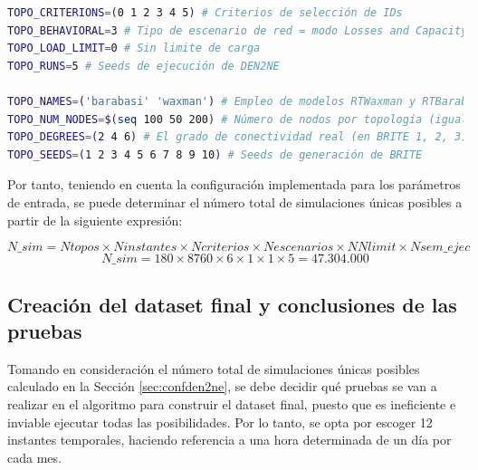\vspace{3mm}

\begin{lstlisting}[language=bash, style=Consola, caption={Configuración de los parámetros de entrada en el script de automatización de \acrshort{den2ne}}]
TOPO_CRITERIONS=(0 1 2 3 4 5) # Criterios de selección de IDs
TOPO_BEHAVIORAL=3 # Tipo de escenario de red = modo Losses and Capacity (3)         
TOPO_LOAD_LIMIT=0 # Sin limite de carga
TOPO_RUNS=5 # Seeds de ejecución de DEN2NE

TOPO_NAMES=('barabasi' 'waxman') # Empleo de modelos RTWaxman y RTBarabasi (igual que BRITE)
TOPO_NUM_NODES=$(seq 100 50 200) # Número de nodos por topología (igual que BRITE)
TOPO_DEGREES=(2 4 6) # El grado de conectividad real (en BRITE 1, 2, 3)
TOPO_SEEDS=(1 2 3 4 5 6 7 8 9 10) # Seeds de generación de BRITE
\end{lstlisting}

\vspace{3mm}

Por tanto, teniendo en cuenta la configuración implementada para los parámetros de entrada, se puede determinar el número total de simulaciones únicas posibles a partir de la siguiente expresión:

    \[\textit{N\_sim} = \textit{Ntopos} \times \textit{Ninstantes} \times \textit{Ncriterios} 
    \times \textit{Nescenarios} \times \textit{NNlimit} \times \textit{Nsem\_ejec}\]
    \[\textit{N\_sim} = 180 \times 8760 \times 6 \times 1 \times 1 \times 5 = 47.304.000\] 

    
\subsection{Creación del dataset final y conclusiones de las pruebas}
\label{sec:datasetfinal}

Tomando en consideración el número total de simulaciones únicas posibles calculado en la Sección \ref{sec:confden2ne}, se debe decidir qué pruebas se van a realizar en el algoritmo para construir el dataset final, puesto que es ineficiente e inviable ejecutar todas las posibilidades. Por lo tanto, se opta por escoger 12 instantes temporales, haciendo referencia a una hora determinada de un día por cada mes. 

\vspace{3mm}


